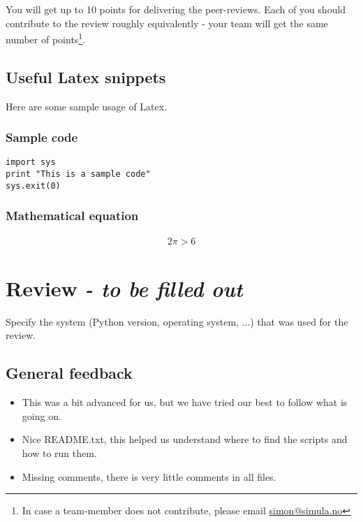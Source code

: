 \documentclass[a4paper]{article}
\begin{document}
You will get up to 10 points for delivering the peer-reviews. Each of you should contribute to the review roughly equivalently - your team will get the same number of points\footnote{In case a team-member does not contribute, please email \href{mailto:simon@simula.no}{simon@simula.no}}. 

\subsection{Useful Latex snippets}
Here are some sample usage of Latex.

\subsubsection{Sample code}
\begin{verbatim}
import sys
print "This is a sample code"
sys.exit(0)
\end{verbatim}

\subsubsection{Mathematical equation}
\begin{align}
2 \pi > 6
\end{align}



\section{Review \emph{- to be filled out}}\label{sec:review}

Specify the system (Python version, operating system, ...) that was used for the review.

\subsection*{General feedback}
\begin{itemize}
\item This was a bit advanced for us, but we have tried our best to follow what is going on. 
\item Nice README.txt, this helped us understand where to find the scripts and how to run them.
\item Missing comments, there is very little comments in all files.
\end{itemize}
\end{document}
